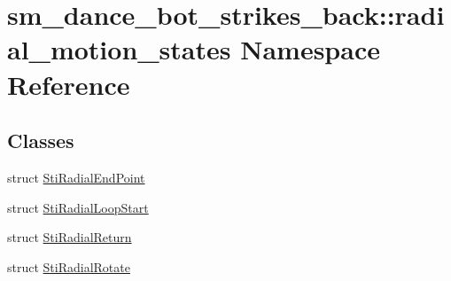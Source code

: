 \hypertarget{namespacesm__dance__bot__strikes__back_1_1radial__motion__states}{}\section{sm\+\_\+dance\+\_\+bot\+\_\+strikes\+\_\+back\+:\+:radial\+\_\+motion\+\_\+states Namespace Reference}
\label{namespacesm__dance__bot__strikes__back_1_1radial__motion__states}
\subsection*{Classes}
\begin{DoxyCompactItemize}
\item 
struct \hyperlink{structsm__dance__bot__strikes__back_1_1radial__motion__states_1_1StiRadialEndPoint}{Sti\+Radial\+End\+Point}
\item 
struct \hyperlink{structsm__dance__bot__strikes__back_1_1radial__motion__states_1_1StiRadialLoopStart}{Sti\+Radial\+Loop\+Start}
\item 
struct \hyperlink{structsm__dance__bot__strikes__back_1_1radial__motion__states_1_1StiRadialReturn}{Sti\+Radial\+Return}
\item 
struct \hyperlink{structsm__dance__bot__strikes__back_1_1radial__motion__states_1_1StiRadialRotate}{Sti\+Radial\+Rotate}
\end{DoxyCompactItemize}

